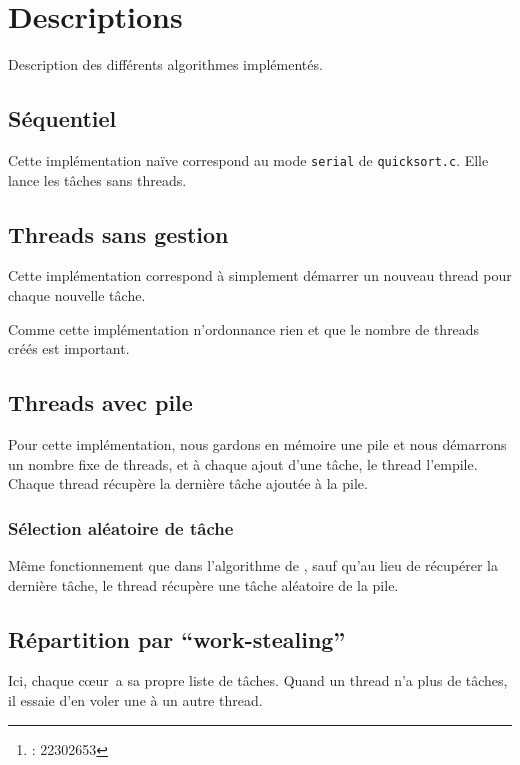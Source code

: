 \documentclass[a4paper]{article}
\title{\docTitle}
\author{\href{\authorMail}{\anri}\thanks{\anri : 22302653}}
\date{Année universitaire 2023-2024}
\newcommand{\docref}[1]{\textit{\nameref{#1}}} %
\def\coeur{c\oe{}ur}
\def\ws{\enquote{work-stealing}}
\begin{document}
\maketitle
\flushbottom
\tableofcontents
\clearpage

\section{Descriptions}
Description des différents algorithmes implémentés.

\subsection{Séquentiel}
Cette implémentation naïve correspond au mode \texttt{serial}
de \texttt{quicksort.c}. Elle lance les tâches sans threads.

\subsection[Threads sans gestion]{Threads sans gestion}
Cette implémentation correspond à simplement démarrer un nouveau thread
pour chaque nouvelle tâche.

Comme cette implémentation n'ordonnance rien et que le nombre de threads créés
est important.

\subsection{Threads avec pile}\label{desc:th_pile}
Pour cette implémentation, nous gardons en mémoire une pile et nous démarrons
un nombre fixe de threads, et à chaque ajout d'une tâche, le thread l'empile.
Chaque thread récupère la dernière tâche ajoutée à la pile.

\subsubsection{Sélection aléatoire de tâche}
Même fonctionnement que dans l'algorithme de \docref{desc:th_pile}, sauf
qu'au lieu de récupérer la dernière tâche, le thread récupère une tâche
aléatoire de la pile.

\subsection{Répartition par \ws}\label{desc:ws}
Ici, chaque \coeur~a sa propre liste de tâches. Quand un thread n'a
plus de tâches, il essaie d'en voler une à un autre thread.
\end{document}
